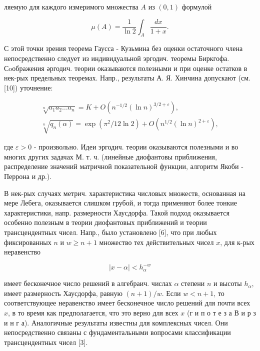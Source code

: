 \documentclass[10pt]{article}
\begin{document}
ляемую для каждого измеримого множества $A$ из $(0,1)$ формулой



\[

\mu(A)=\frac{1}{\ln 2} \int_{A} \frac{d x}{1+x} .

\]



С этой точки зрения теорема Гаусса - Кузьмина без оценки остаточного члена непосредственно следует из индивидуальной эргодич. теоремы Биркгофа. Сoображения әргодич. теории оказываются полезными и при оценке остатков в нек-рых предельных теоремах. Напр., результаты А. Я. Хинчина допускают (см. [10]) уточнение:



\[

\begin{gathered}

\sqrt[n]{a_{1} a_{2} \ldots a_{n}}=K+O\left(n^{-1 / 2}(\ln n)^{3 / 2+\varepsilon}\right), \\

\sqrt[n]{q_{n}(\alpha)}=\exp \left(\pi^{2} / 12 \ln 2\right)+O\left(n^{1 / 2}(\ln n)^{2+\varepsilon}\right),

\end{gathered}

\]



где $\varepsilon>0$ - произвольно. Идеи эргодич. теории оказываются полезными и во многих других задачах М. т. ч. (линейные диофантовы приближения, распределение значений матричной показательной функции, алгоритм Якоби - Перрона и др.).



В нек-рых случаях метрич. характеристика числовых множеств, основанная на мере Лебега, оказывается слишком грубой, и тогда применяют более тонкие характеристики, напр. размерности Хаусдорфа. Такой подход оказывается особенно полезным в теории диофантовых приближений и теории трансцендентных чисел. Напр., было установлено [6], что при любых фиксированных $n$ и $w \geqslant n+1$ множество тех действительных чисел $x$, для к-рых неравенство



\[

|x-\alpha|<h_{\alpha}^{-w}

\]



имеет бесконечное число решений в алгебраич. числах $\alpha$ степени $n$ и высоты $h_{\alpha}$, имеет размерность Хаусдорфа, равную $(n+1) / w$. Если $w<n+1$, то соответствующее неравенство имеет бесконечное число решений для почти всех $x$, в то время как предполагается, что это верно для всех $x$ (г и п о т е з а В и р з и н г а). Аналогичные результаты известны для комплексных чисел. Они непосредственно связаны с фундаментальными вопросами классификации трансцендентных чисел [3].
\end{document}

